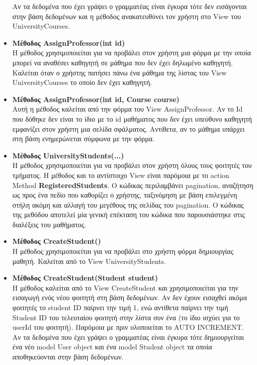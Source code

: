 \documentclass[12pt]{article}
\begin{document}
\begin{itemize}
	Αν τα δεδομένα που έχει γράψει ο γραμματέας είναι έγκυρα τότε δεν εισάγονται στην βάση δεδομένων και η μέθοδος ανακατευθύνει τον χρήστη στο View του UniversityCourses.
	
	\item \textbf{Μέθοδος AssignProfessor(int id)}\\
	Η μέθοδος χρησιμοποιείται για να προβάλει στον χρήστη μια φόρμα με την οποία μπορεί να αναθέσει καθηγητή σε μάθημα που δεν έχει δηλωμένο καθηγητή. Καλείται όταν ο χρήστης πατήσει πάνω ένα μάθημα της λίστας του View 	UniversityCourses το οποίο δεν έχει καθηγητή.		

	\item \textbf{Μέθοδος AssignProfessor(int id, Course course)}\\
	Αυτή η μέθοδος καλείται από την φόρμα του View AssignProfessor.	Αν το Id που δόθηκε δεν είναι το ίδιο με το id μαθήματος που δεν έχει υπεύθυνο καθηγητή  εμφανίζει στον χρήστη μια σελίδα σφάλματος. Αντίθετα, αν το μάθημα υπάρχει στη βάση ενημερώνεται σύμφωνα με την φόρμα.

	\item \textbf{Μέθοδος UniversityStudents(...)}\\
	Η μέθοδος χρησιμοποιείται για να προβάλει στον χρήστη όλους τους φοιτητές του τμήματος. Η μέθοδος και το αντίστοιχο View είναι παρόμοια με το action Method \textbf{RegisteredStudents}. Ο κώδικας περιλαμβάνει pagination, αναζήτηση ως προς ένα πεδίο που καθορίζει ο χρήστης, ταξινόμηση με βάση επιλεγμένη στήλη ακόμη και αλλαγή του μεγέθους της σελίδας του pagination. Ο κώδικας της μεθόδου αποτελεί μία γενική επέκταση του κώδικα που παρουσιάστηκε στις διαλέξεις του μαθήματος.
	
	\item \textbf{Μέθοδος CreateStudent()}\\
	Η μέθοδος χρησιμοποιείται για να προβάλει στο χρήστη φόρμα δημιουργίας μαθητή. Καλείται από το View UniversityStudents.
						
	\item \textbf{Μέθοδος CreateStudent(Student student)}\\
	Η μέθοδος καλείται από το View CreateStudent και χρησιμοποιείται για την εισαγωγή ενός νέου φοιτητή στη βάση δεδομένων. Αν δεν έχουν εισαχθεί ακόμα φοιτητές το  student ID παίρνει την τιμή 1, ενώ αντίθετα παίρνει την τιμή Student ID του τελευταίου φοιτητή στην λίστα συν ένα (το ίδιο ισχύει για το userId του φοιτητή). Παρόμοια με πριν υλοποιείται το AUTO INCREMENT. Αν τα δεδομένα που έχει γράψει ο γραμματέας είναι έγκυρα τότε δημιουργείται ένα νέο model User object και ένα model Student object τα οποία αποθηκεύονται στην βάση δεδομένων.
	

\end{itemize}
\end{document}
